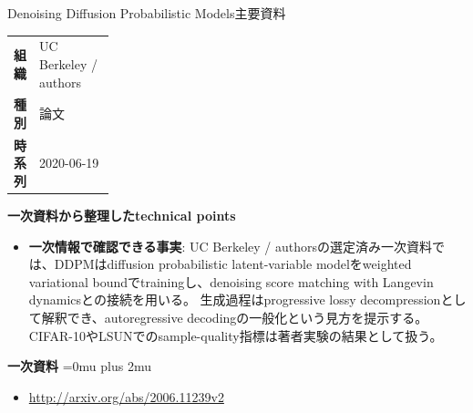 \begin{technicalnote}{Denoising Diffusion Probabilistic Models}{主要資料}
\begingroup
\begin{tabularx}{\linewidth}{@{}>{\bfseries}p{0.22\linewidth}X@{}}
組織 & UC Berkeley / authors \\
種別 & 論文 \\
時系列 & 2020-06-19 \\
\end{tabularx}
\smallskip
\begin{minipage}{\linewidth}
{\bfseries 一次資料から整理したtechnical points}
\begin{itemize}[leftmargin=1.5em,itemsep=0.35em]
\item \textbf{一次情報で確認できる事実}: UC Berkeley / authorsの選定済み一次資料では、DDPMはdiffusion probabilistic latent-variable modelをweighted variational boundでtrainingし、denoising score matching with Langevin dynamicsとの接続を用いる。 生成過程はprogressive lossy decompressionとして解釈でき、autoregressive decodingの一般化という見方を提示する。 CIFAR-10やLSUNでのsample-quality指標は著者実験の結果として扱う。
\end{itemize}
\begin{samepage}
{\bfseries 一次資料}
\begingroup\sloppy
\Urlmuskip=0mu plus 2mu\relax
\begin{itemize}[leftmargin=1.5em,itemsep=0.25em]
\item {\scriptsize\url{http://arxiv.org/abs/2006.11239v2}}
\end{itemize}
\endgroup
\end{samepage}
\end{minipage}
\endgroup
\end{technicalnote}
\medskip

